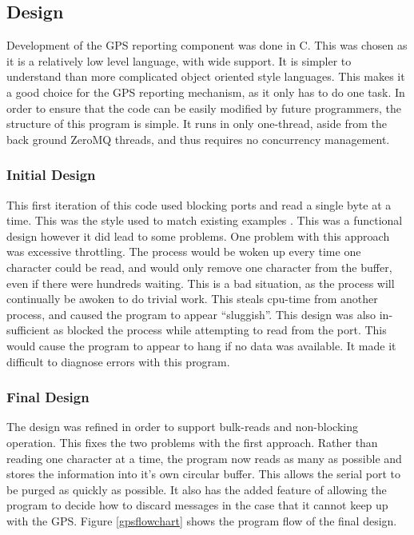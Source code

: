 \subsection {Design}

Development of the GPS reporting component was done in C. This was chosen as it is a relatively low level language, with wide support. It is simpler to understand than more complicated object oriented style languages. This makes it a good choice for the GPS reporting mechanism, as it only has to do one task. In order to ensure that the code can be easily modified by future programmers, the structure of this program is simple. It runs in only one-thread, aside from the back ground ZeroMQ threads, and thus requires no concurrency management.

\subsubsection{Initial Design}

This first iteration of this code used blocking ports and read a single byte at a time. This was the style used to match existing examples \cite{thesis_varma}. This was a functional design however it did lead to some problems. One problem with this approach was excessive throttling. The process would be woken up every time one character could be read, and would only remove one character from the buffer, even if there were hundreds waiting. This is a bad situation, as the process will continually be awoken to do trivial work. This steals cpu-time from another process, and caused the program to appear “sluggish”. This design was also in-sufficient as blocked the process while attempting to read from the port. This would cause the program to appear to hang if no data was available. It made it difficult to diagnose errors with this program.

\subsubsection{Final Design}

The design was refined in order to support bulk-reads and non-blocking operation. This fixes the two problems with the first approach. Rather than reading one character at a time, the program now reads as many as possible and stores the information into it's own circular buffer. This allows the serial port to be purged as quickly as possible. It also has the added feature of allowing the program to decide how to discard messages in the case that it cannot keep up with the GPS. Figure \ref{gpsflowchart} shows the program flow of the final design.

